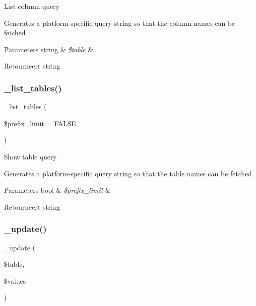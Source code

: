 List column query

Generates a platform-\/specific query string so that the column names can be fetched


\begin{DoxyParams}[1]{Parameters}
string & {\em \$table} & \\
\hline
\end{DoxyParams}
\begin{DoxyReturn}{Retourneert}
string 
\end{DoxyReturn}
\mbox{\label{class_c_i___d_b__pdo__pgsql__driver_a435c0f3ce54fe7daa178baa8532ebd54}} 
\subsubsection{\texorpdfstring{\_list\_tables()}{\_list\_tables()}}
{\footnotesize\ttfamily \+\_\+list\+\_\+tables (\begin{DoxyParamCaption}\item[{}]{\$prefix\+\_\+limit = {\ttfamily FALSE} }\end{DoxyParamCaption})\hspace{0.3cm}{\ttfamily [protected]}}

Show table query

Generates a platform-\/specific query string so that the table names can be fetched


\begin{DoxyParams}[1]{Parameters}
bool & {\em \$prefix\+\_\+limit} & \\
\hline
\end{DoxyParams}
\begin{DoxyReturn}{Retourneert}
string 
\end{DoxyReturn}
\mbox{\label{class_c_i___d_b__pdo__pgsql__driver_a2540b03a93fa73ae74c10d0e16fc073e}} 
\subsubsection{\texorpdfstring{\_update()}{\_update()}}
{\footnotesize\ttfamily \+\_\+update (\begin{DoxyParamCaption}\item[{}]{\$table,  }\item[{}]{\$values }\end{DoxyParamCaption})\hspace{0.3cm}{\ttfamily [protected]}}

